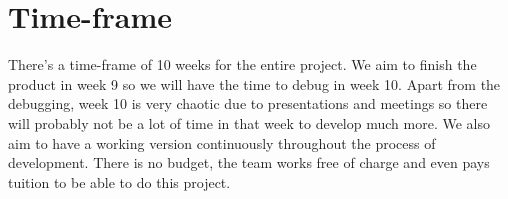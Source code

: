 \documentclass[a4paper]{article}
\begin{document}
\section{Time-frame}
There's a time-frame of 10 weeks for the entire project. We aim to finish the product in week 9 so we will have the time to debug in week 10. Apart from the debugging, week 10 is very chaotic due to presentations and meetings so there will probably not be a lot of time in that week to develop much more. We also aim to have a working version continuously throughout the process of development. There is no budget, the team works free of charge and even pays tuition to be able to do this project.



\end{document}
